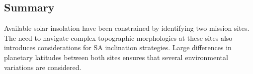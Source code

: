 \subsection{Summary}
Available solar insolation have been constrained by identifying two mission sites. The need to navigate complex topographic morphologies at these sites also introduces considerations for \ac{SA} inclination strategies. Large differences in planetary latitudes between both sites ensures that several environmental variations are considered.
